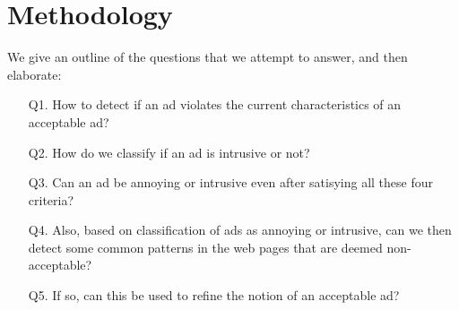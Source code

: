 \section{Methodology}
We give an outline of the questions that we attempt to answer, and then elaborate:
\begin{itemize}
\item [Q1.] How to detect if an ad violates the current characteristics of an acceptable ad?
\item [Q2.] How do we classify if an ad is intrusive or not? \item [Q3.] Can an ad be annoying or intrusive even after satisying all these four criteria?
\item [Q4.] Also, based on classification of ads as annoying or intrusive, can we then detect some common patterns in the web pages that are deemed non-acceptable?
\item [Q5.] If so, can this be used to refine the notion of an acceptable ad?
\end{itemize}

